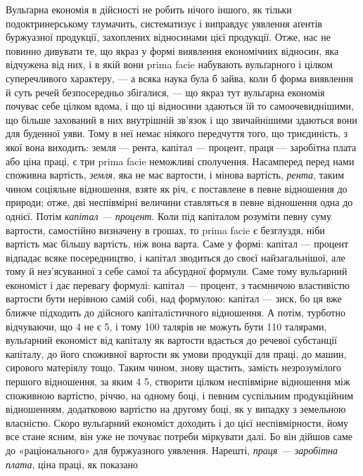Вульґарна економія в дійсності не робить нічого іншого, як тільки подоктринерському
тлумачить, систематизує і виправдує уявлення аґентів буржуазної
продукції, захоплених відносинами цієї продукції. Отже, нас не повинно
дивувати те, що якраз у формі виявлення економічних відносин, яка відчужена
від них, і в якій вони prima facie набувають вульґарного і цілком суперечливого
характеру, — а всяка наука була б зайва, коли б форма виявлення й суть
речей безпосередньо збігалися, — що якраз тут вульґарна економія почуває себе
цілком вдома, і що ці відносини здаються їй то самоочевиднішими, що більше
захований в них внутрішній зв’язок і що звичайнішими здаються вони для
буденної уяви. Тому в неї немає ніякого передчуття того, що триєдиність,
з якої вона виходить: земля — рента, капітал — процент, праця — заробітна плата
або ціна праці, є три prima facie неможливі сполучення. Насамперед перед
нами споживна вартість, \emph{земля}, яка не має вартости, і мінова вартість, \emph{рента},
таким чином соціяльне відношення, взяте як річ, є поставлене в певне
відношення до природи; отже, дві неспівмірні величини ставляться в певне
відношення одна до однієї. Потім \emph{капітал — процент}. Коли під капіталом
розуміти певну суму вартости, самостійно визначену в грошах, то prima facie
є безглуздя, ніби вартість має більшу вартість, ніж вона варта. Саме у формі:
капітал — процент відпадає всяке посередництво, і капітал зводиться до своєї
найзагальнішої, але тому й нез’ясуванної з себе самої та абсурдної формули.
Саме тому вульґарний економіст і дає перевагу формулі: капітал — процент,
з таємничою властивістю вартости бути нерівною самій собі, над формулою:
капітал — зиск, бо ця вже ближче підходить до дійсного капіталістичного відношення.
А потім, турботно відчуваючи, що 4 не є 5, і тому 100 талярів не
можуть бути 110 талярами, вульґарний економіст від капіталу як вартости
вдається до речевої субстанції капіталу, до його споживної вартости як умови
продукції для праці, до машин, сирового матеріялу тощо. Таким чином, знову
щастить, замість незрозумілого першого відношення, за яким 4 \deq{} 5, створити
цілком неспівмірне відношення між споживною вартістю, річчю, на одному боці,
і певним суспільним продукційним відношенням, додатковою вартістю на другому
боці, як у випадку з земельною власністю. Скоро вульґарний економіст
доходить і до цієї неспівмірности, йому все стане ясним, він уже не почуває
потреби міркувати далі. Бо він дійшов саме до «раціонального» для буржуазного
уявлення. Нарешті, \emph{праця — заробітна плата}, ціна праці, як показано
\parbreak{}  %
